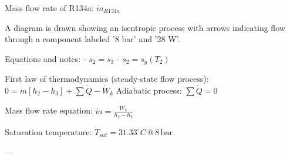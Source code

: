 Mass flow rate of R134a:  
\( \dot{m}_{R134a} \)  

A diagram is drawn showing an isentropic process with arrows indicating flow through a component labeled '8 bar' and '28 W'.  

Equations and notes:  
- \( s_2 = s_3 \)  
- \( s_2 = s_g(T_2) \)  

First law of thermodynamics (steady-state flow process):  
\( 0 = \dot{m} [h_2 - h_3] + \sum \dot{Q} - \dot{W}_k \)  
Adiabatic process: \( \sum \dot{Q} = 0 \)  

Mass flow rate equation:  
\( \dot{m} = \frac{\dot{W}_k}{h_2 - h_3} \)  

Saturation temperature:  
\( T_{sat} = 31.33^\circ C \, @ \, 8 \, \text{bar} \)  

---